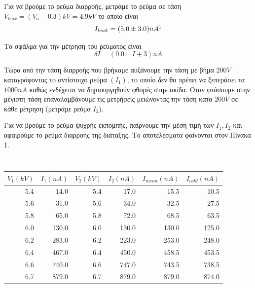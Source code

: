 \documentclass[a4paper]{article}
\begin{document}



Για να βρούμε το ρεύμα διαρροής, μετράμε το ρεύμα σε τάση $V_{leak}=(V_a-0.3)kV=4.9kV$ το οποίο είναι 
\begin{equation*}
I_{leak} = (5.0\pm3.0)nA \footnotemark
\end{equation*}

Το σφάλμα για την μέτρηση του ρεύματος είναι 
\begin{equation}
\delta I = (0.01\cdot I +3 )nA
\end{equation}

Τώρα από την τάση διαρροής που βρήκαμε αυξάνουμε την τάση με βήμα $200V$ καταγράφοντας το αντίστοιχο ρεύμα $(I_1)$, το οποίο δεν θα πρέπει να ξεπεράσει τα $1000nA$ καθώς ενδέχεται να δημιουργηθούν φθορές στην ακίδα. Όταν φτάσουμε στην μέγιστη τάση επαναλαμβάνουμε τις μετρήσεις μειώνοντας την τάση κατα $200V$ σε κάθε μέτρηση (μετράμε ρεύμα $I_2$). 

Για να βρούμε το ρεύμα ψυχρής εκπομπής, παίρνουμε την μέση τιμή των $I_1,I_2$ και αφαιρούμε το ρεύμα διαρροής της διάταξης. Το αποτελέσματα φαίνονται στον Πίνακα 1. 

\begin{table}[h!]
\centering 
\caption{\textcolor{white}{.}}\footnotemark
\begin{tabular}{r|r||r|r||r|r}
$V_1(kV)$& $I_1(nA)$ & $V_2(kV)$ & $I_2(nA)$ & $I_{mean}(nA)$ & $I_{cold}(nA)$\\
\hline\hline
    5.4&  14.0&   5.4&  17.0&  15.5& 10.5  \\
    5.6&  31.0&   5.6&  34.0&  32.5& 27.5 \\
    5.8&  65.0&   5.8&  72.0&  68.5& 63.5\\
    6.0& 130.0&   6.0& 130.0& 130.0&125.0\\
    6.2& 283.0&   6.2& 223.0& 253.0&248.0\\
    6.4& 467.0&   6.4& 450.0& 458.5&453.5\\
    6.6& 740.0&   6.6& 747.0& 743.5&738.5\\
    6.7& 879.0&   6.7& 879.0& 879.0&874.0\\
\end{tabular}
\end{table}
\end{document}
